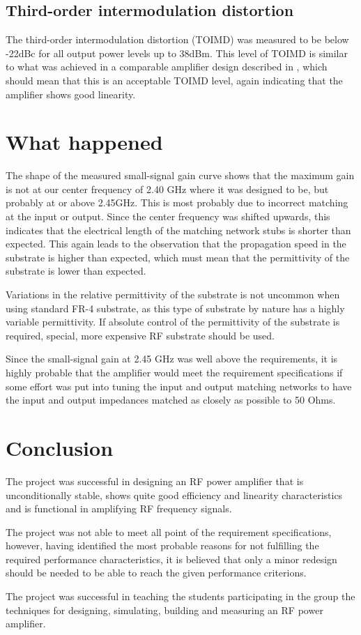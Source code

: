 	\subsection{Third-order intermodulation distortion}
	The third-order intermodulation distortion (TOIMD) was measured to be below -22dBc for all output power levels up to 38dBm. This level of TOIMD is similar to what was achieved in a comparable amplifier design described in \cite{5WLTE}, which should mean that this is an acceptable TOIMD level, again indicating that the amplifier shows good linearity.
  \section{What happened}
  The shape of the measured small-signal gain curve shows that the maximum gain is not at our center frequency of 2.40 GHz where it was designed to be, but probably at or above 2.45GHz. This is most probably due to incorrect matching at the input or output. Since the center frequency was shifted upwards, this indicates that the electrical length of the matching network stubs is shorter than expected. This again leads to the observation that the propagation speed in the substrate is higher than expected, which must mean that the permittivity of the substrate is lower than expected.

  Variations in the relative permittivity of the substrate is not uncommon when using standard FR-4 substrate, as this type of substrate by nature has a highly variable permittivity. If absolute control of the permittivity of the substrate is required, special, more expensive RF substrate should be used.

  Since the small-signal gain at 2.45 GHz was well above the requirements, it is highly probable that the amplifier would meet the requirement specifications if some effort was put into tuning the input and output matching networks to have the input and output impedances matched as closely as possible to 50 Ohms.

  \section{Conclusion}
  The project was successful in designing an RF power amplifier that is unconditionally stable, shows quite good efficiency and linearity characteristics and is functional in amplifying RF frequency signals.

  The project was not able to meet all point of the requirement specifications, however, having identified the most probable reasons for not fulfilling the required performance characteristics, it is believed that only a minor redesign should be needed to be able to reach the given performance criterions.

  The project was successful in teaching the students participating in the group the techniques for designing, simulating, building and measuring an RF power amplifier.
